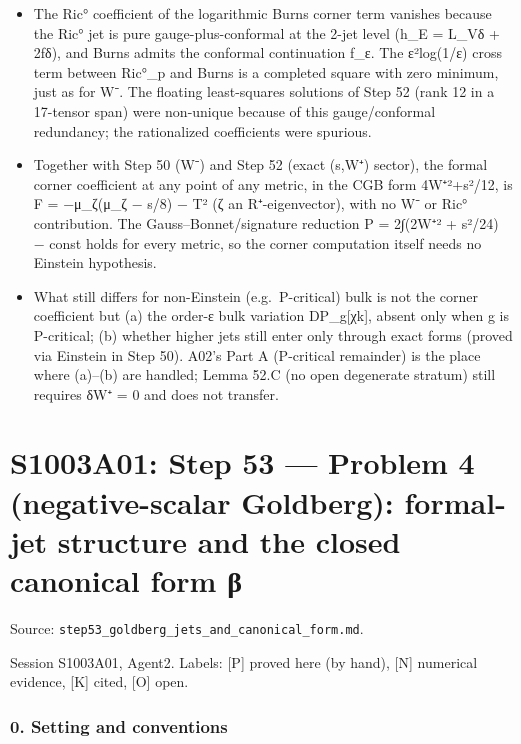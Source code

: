 \documentclass[
  10pt,
]{report}
\providecommand{\tightlist}{%
  \setlength{\itemsep}{0pt}\setlength{\parskip}{0pt}}
\begin{document}
\begin{itemize}
\tightlist
\item
  The Ric° coefficient of the logarithmic Burns corner term vanishes
  because the Ric° jet is pure gauge-plus-conformal at the 2-jet level
  (h\_E = L\_Vδ + 2fδ), and Burns admits the conformal continuation
  f\_ε. The ε²log(1/ε) cross term between Ric°\_p and Burns is a
  completed square with zero minimum, just as for W⁻. The floating
  least-squares solutions of Step 52 (rank 12 in a 17-tensor span) were
  non-unique because of this gauge/conformal redundancy; the
  rationalized coefficients were spurious.
\item
  Together with Step 50 (W⁻) and Step 52 (exact (s,W⁺) sector), the
  formal corner coefficient at any point of any metric, in the CGB form
  4\textbar W⁺\textbar²+s²/12, is F = −μ\_ζ(μ\_ζ − s/8) −
  \textbar T\textbar² (ζ an R⁺-eigenvector), with no W⁻ or Ric°
  contribution. The Gauss--Bonnet/signature reduction P =
  2∫(2\textbar W⁺\textbar² + s²/24) − const holds for every metric, so
  the corner computation itself needs no Einstein hypothesis.
\item
  What still differs for non-Einstein (e.g.~P-critical) bulk is not the
  corner coefficient but (a) the order-ε bulk variation DP\_g{[}χk{]},
  absent only when g is P-critical; (b) whether higher jets still enter
  only through exact forms (proved via Einstein in Step 50). A02's Part
  A (P-critical remainder) is the place where (a)--(b) are handled;
  Lemma 52.C (no open degenerate stratum) still requires δW⁺ = 0 and
  does not transfer.
\end{itemize}

\hypertarget{s1003a01-step-53-problem-4-negative-scalar-goldberg-formal-jet-structure-and-the-closed-canonical-form-ux3b2}{%
\chapter{S1003A01: Step 53 --- Problem 4 (negative-scalar Goldberg):
formal-jet structure and the closed canonical form
β}\label{s1003a01-step-53-problem-4-negative-scalar-goldberg-formal-jet-structure-and-the-closed-canonical-form-ux3b2}}

Source: \texttt{step53\_goldberg\_jets\_and\_canonical\_form.md}.

Session S1003A01, Agent2. Labels: {[}P{]} proved here (by hand), {[}N{]}
numerical evidence, {[}K{]} cited, {[}O{]} open.

\hypertarget{setting-and-conventions}{%
\subsection{0. Setting and conventions}\label{setting-and-conventions}}
\end{document}
